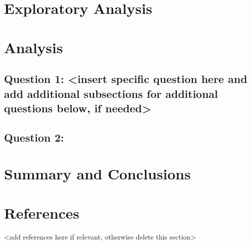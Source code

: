 \documentclass[
  12pt,
]{article}
\begin{document}
\hypertarget{exploratory-analysis}{%
\section{Exploratory Analysis}\label{exploratory-analysis}}

\newpage

\hypertarget{analysis}{%
\section{Analysis}\label{analysis}}

\hypertarget{question-1-insert-specific-question-here-and-add-additional-subsections-for-additional-questions-below-if-needed}{%
\subsection{Question 1: \textless insert specific question here and add
additional subsections for additional questions below, if
needed\textgreater{}}\label{question-1-insert-specific-question-here-and-add-additional-subsections-for-additional-questions-below-if-needed}}

\hypertarget{question-2}{%
\subsection{Question 2:}\label{question-2}}

\newpage

\hypertarget{summary-and-conclusions}{%
\section{Summary and Conclusions}\label{summary-and-conclusions}}

\newpage

\hypertarget{references}{%
\section{References}\label{references}}

\textless add references here if relevant, otherwise delete this
section\textgreater{}
\end{document}
